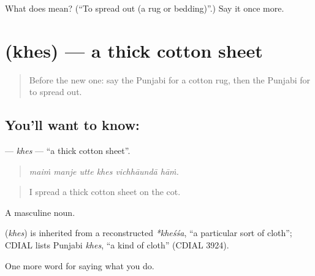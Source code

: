 \begin{tcolorbox}[breakable,colback=teal!4,colframe=teal!35!black,title={Before you move on}]
What does  mean? (\textquotedblleft{}To spread out (a rug or bedding)\textquotedblright{}.) Say it once more.
\end{tcolorbox}
\section[\texorpdfstring{\pa{ਖੇਸ} (khes)}{ਖੇਸ (khes)}]{ (khes) — a thick cotton sheet}

\label{lesson:PA-C233-khes}



\begin{quote}
Before the new one: say the Punjabi for a cotton rug, then the Punjabi for to spread out.
\end{quote}

\subsection*{You'll want to know: }
\textbf{} — \emph{khes} — \textquotedblleft{}a thick cotton sheet\textquotedblright{}.

\begin{quote}
     
\end{quote}

\begin{quote}
\emph{maiṁ manje utte khes vichhāundā hāṁ.}
\end{quote}

\begin{quote}
I spread a thick cotton sheet on the cot.
\end{quote}

A masculine noun.

\begin{cousinweb}
\textbf{} (\emph{khes}) is inherited from a reconstructed \emph{*kheśśa}, \textquotedblleft{}a particular sort of cloth\textquotedblright{}; CDIAL lists Punjabi \emph{khes}, \textquotedblleft{}a kind of cloth\textquotedblright{} (CDIAL 3924).
\end{cousinweb}

\begin{grammarlens}[title={What you've built}]
One more word for saying what you do.
\end{grammarlens}

